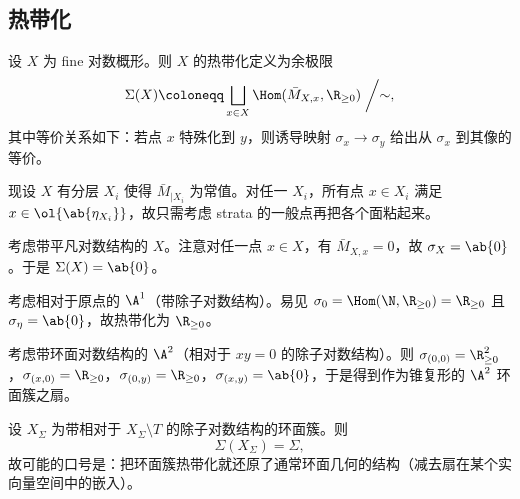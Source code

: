 \subsection{热带化}%
\label{sub:Tropicalization}

设 \(X\) 为 fine 对数概形。则 \(X\) 的热带化定义为余极限
\[\Sigma(X) \coloneqq \bigsqcup_{x \in X} \Hom(\bar{M}_{X,x}, \R_{\geq 0}) \biggm/ \sim, \]
其中等价关系如下：若点 \(x\) 特殊化到 \(y\)，则诱导映射 \(\sigma_x \to \sigma_y\) 给出从 \(\sigma_x\) 到其像的等价。

现设 \(X\) 有分层 \(X_i\) 使得 \(\bar{M}_{|X_i}\) 为常值。对任一 \(X_i\)，所有点 \(x \in X_i\) 满足 \(x \in \ol{\ab\{\eta_{X_i}\}}\)，故只需考虑 strata 的一般点再把各个面粘起来。

\begin{exm}
    考虑带平凡对数结构的 \(X\)。注意对任一点 \(x \in X\)，有 \(\bar{M}_{X,x} = 0\)，故 \(\sigma_X = \ab\{0\}\)。于是 \(\Sigma(X) = \ab\{0\}\)。
\end{exm}

\begin{exm}
    考虑相对于原点的 \(\A^1\)（带除子对数结构）。易见 \(\sigma_0 = \Hom(\N, \R_{\geq 0}) = \R_{\geq 0}\) 且 \(\sigma_{\eta} = \ab\{0\}\)，故热带化为 \(\R_{\geq 0}\)。
\end{exm}

\begin{exm}
    考虑带环面对数结构的 \(\A^2\)（相对于 \(xy = 0\) 的除子对数结构）。则 \(\sigma_{(0,0)} = \R^2_{\geq 0}\)，\(\sigma_{(x,0)} = \R_{\geq 0}\)，\(\sigma_{(0,y)} = \R_{\geq 0}\)，\(\sigma_{(x,y)} = \ab\{0\}\)，于是得到作为锥复形的 \(\A^2\) 环面簇之扇。
\end{exm}

\begin{exm}
    设 \(X_{\Sigma}\) 为带相对于 \(X_{\Sigma} \setminus T\) 的除子对数结构的环面簇。则
    \[ \Sigma(X_{\Sigma}) = \Sigma, \]
    故可能的口号是：把环面簇热带化就还原了通常环面几何的结构（减去扇在某个实向量空间中的嵌入）。
\end{exm}

